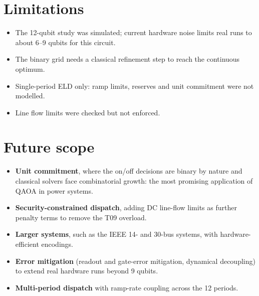 \section{Limitations}
\begin{itemize}
\item The 12-qubit study was simulated; current hardware noise limits real runs to about 6--9 qubits for this circuit.
\item The binary grid needs a classical refinement step to reach the continuous optimum.
\item Single-period ELD only: ramp limits, reserves and unit commitment were not modelled.
\item Line flow limits were checked but not enforced.
\end{itemize}

\section{Future scope}
\begin{itemize}
\item \textbf{Unit commitment}, where the on/off decisions are binary by nature and classical solvers face combinatorial growth: the most promising application of QAOA in power systems.
\item \textbf{Security-constrained dispatch}, adding DC line-flow limits as further penalty terms to remove the T09 overload.
\item \textbf{Larger systems}, such as the IEEE 14- and 30-bus systems, with hardware-efficient encodings.
\item \textbf{Error mitigation} (readout and gate-error mitigation, dynamical decoupling) to extend real hardware runs beyond 9 qubits.
\item \textbf{Multi-period dispatch} with ramp-rate coupling across the 12 periods.
\end{itemize}
